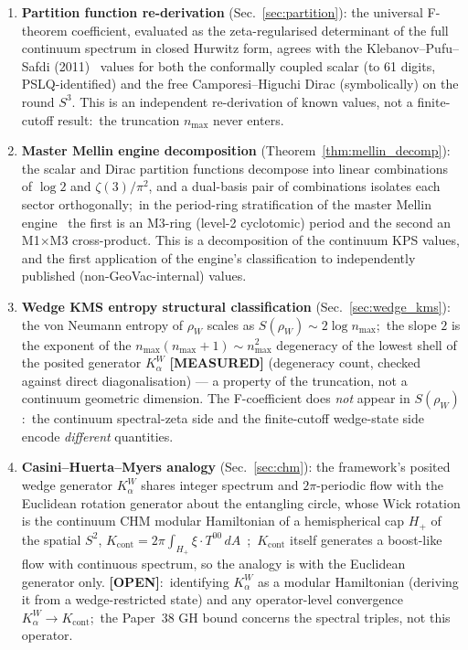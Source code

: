 \documentclass[11pt,a4paper]{article}
\theoremstyle{plain}
\theoremstyle{definition}
\newcommand{\nmax}{n_{\max}}
\newcommand{\sthree}{S^{3}}
\newcommand{\Kalpha}{K_{\alpha}^{W}}
\newcommand{\rhoW}{\rho_{W}}
\begin{document}
\begin{enumerate}
\item \textbf{Partition function re-derivation}
(Sec.~\ref{sec:partition}): the universal F-theorem coefficient,
evaluated as the zeta-regularised determinant of the full continuum
spectrum in closed Hurwitz form, agrees with the
Klebanov--Pufu--Safdi (2011)~\cite{klebanov_pufu_safdi2011} values for
both the conformally coupled scalar (to 61 digits, PSLQ-identified) and
the free Camporesi--Higuchi Dirac (symbolically) on the round $\sthree$. This is an independent re-derivation of
known values, not a finite-cutoff result:\ the truncation $\nmax$
never enters.

\item \textbf{Master Mellin engine decomposition}
(Theorem~\ref{thm:mellin_decomp}): the scalar and Dirac partition
functions decompose into linear combinations of $\log 2$ and
$\zeta(3)/\pi^{2}$, and a dual-basis pair of combinations isolates each
sector orthogonally;\ in the period-ring stratification of the master
Mellin engine~\cite{paper18} the first is an M3-ring (level-2
cyclotomic) period and the second an M1$\times$M3 cross-product. This is a
decomposition of the continuum KPS values, and the first application of
the engine's classification to independently published
(non-GeoVac-internal) values.

\item \textbf{Wedge KMS entropy structural classification}
(Sec.~\ref{sec:wedge_kms}): the von Neumann entropy of $\rhoW$ scales
as $S(\rhoW) \sim 2 \log \nmax$;\ the slope $2$ is the exponent of the
$\nmax(\nmax+1) \sim \nmax^{2}$ degeneracy of the lowest shell of the
posited generator $\Kalpha$ \textbf{[MEASURED]} (degeneracy count,
checked against direct diagonalisation) --- a property of the
truncation, not a continuum geometric dimension. The F-coefficient does \emph{not}
appear in $S(\rhoW)$:\ the continuum spectral-zeta side and the
finite-cutoff wedge-state side encode \emph{different} quantities.

\item \textbf{Casini--Huerta--Myers analogy}
(Sec.~\ref{sec:chm}): the framework's posited wedge generator
$\Kalpha$ shares integer spectrum and $2\pi$-periodic flow with the
Euclidean rotation generator about the entangling circle, whose Wick
rotation is the continuum CHM modular Hamiltonian of a hemispherical
cap $H_{+}$ of the spatial $S^{2}$,
$K_{\mathrm{cont}} = 2\pi \int_{H_{+}} \xi \cdot T^{00}\,
dA$~\cite{casini_huerta_myers2011};\ $K_{\mathrm{cont}}$ itself
generates a boost-like flow with continuous spectrum, so the analogy is
with the Euclidean generator only.
\textbf{[OPEN]}:\ identifying $\Kalpha$ as a modular Hamiltonian
(deriving it from a wedge-restricted state) and any operator-level
convergence $\Kalpha \to K_{\mathrm{cont}}$;\ the Paper~38 GH bound
concerns the spectral triples, not this operator.
\end{enumerate}
\end{document}
